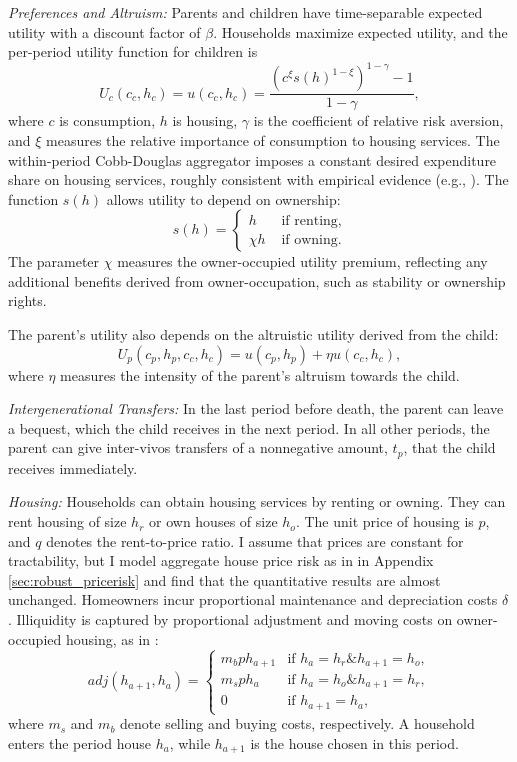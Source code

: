 \documentclass[12pt]{article}
\begin{document}
\textit{Preferences and Altruism:} Parents and children have time-separable expected utility with a discount factor of $\beta$. Households maximize expected utility, and the per-period utility function for children is
\begin{equation}
U_c(c_c,h_c) = u(c_c,h_c) = \frac{\left(c^\xi s(h)^{1-\xi}\right)^{1-\gamma}-1}{1-\gamma},
\end{equation}
where $c$ is consumption, $h$ is housing, $\gamma$ is the coefficient of relative risk aversion, and $\xi$ measures the relative importance of consumption to housing services. The within-period Cobb-Douglas aggregator imposes a constant desired expenditure share on housing services, roughly consistent with empirical evidence (e.g., \cite{davis2011household}). The function $s(h)$ allows utility to depend on ownership:
\begin{equation}
s(h) = \begin{cases}
h & \text{ if renting}, \\
\chi h & \text{ if owning}.
\end{cases}
\end{equation}
The parameter $\chi$ measures the owner-occupied utility premium, reflecting any additional benefits derived from owner-occupation, such as stability or ownership rights.

The parent's utility also depends on the altruistic utility derived from the child:
\begin{equation}
U_p(c_p,h_p,c_c,h_c) = u(c_p,h_p) + \eta u(c_c,h_c),
\end{equation}
where $\eta$ measures the intensity of the parent's altruism towards the child.

\textit{Intergenerational Transfers:} In the last period before death, the parent can leave a bequest, which the child receives in the next period. In all other periods, the parent can give inter-vivos transfers of a nonnegative amount, $t_p$, that the child receives immediately.

\textit{Housing:} Households can obtain housing services by renting or owning. They can rent housing of size $h_r$ or own houses of size $h_o$. The unit price of housing is $p$, and $q$ denotes the rent-to-price ratio. I assume that prices are constant for tractability, but I model aggregate house price risk as in \cite{Corbae2015} in Appendix \ref{sec:robust_pricerisk} and find that the quantitative results are almost unchanged. Homeowners incur proportional maintenance and depreciation costs $\delta$. Illiquidity is captured by proportional adjustment and moving costs on owner-occupied housing, as in \cite{Yang2009}:
\begin{equation}\label{eq:transcost}
adj(h_{a+1},h_a) = \begin{cases}
m_b p h_{a+1} & \text{if } h_{a}=h_r\mathbin{\&} h_{a+1}= h_o, \\
m_s p h_a 	& \text{if } h_a = h_o\mathbin{\&}h_{a+1}=h_r, \\
0 & \text{if } h_{a+1} = h_a,
\end{cases}
\end{equation} where $m_s$ and $m_b$ denote selling and buying costs, respectively. A household enters the period house $h_a$, while $h_{a+1}$ is the house chosen in this period. 
\end{document}

